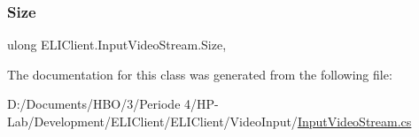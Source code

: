 \mbox{\label{class_e_l_i_client_1_1_input_video_stream_a720f0a6225a45adda7e48fe6e388c645}} 
\subsubsection{\texorpdfstring{Size}{Size}}
{\footnotesize\ttfamily ulong E\+L\+I\+Client.\+Input\+Video\+Stream.\+Size\hspace{0.3cm}{\ttfamily [get]}, {\ttfamily [set]}}



The documentation for this class was generated from the following file\+:\begin{DoxyCompactItemize}
\item 
D\+:/\+Documents/\+H\+B\+O/3/\+Periode 4/\+H\+P-\/\+Lab/\+Development/\+E\+L\+I\+Client/\+E\+L\+I\+Client/\+Video\+Input/\hyperlink{_input_video_stream_8cs}{Input\+Video\+Stream.\+cs}\end{DoxyCompactItemize}
